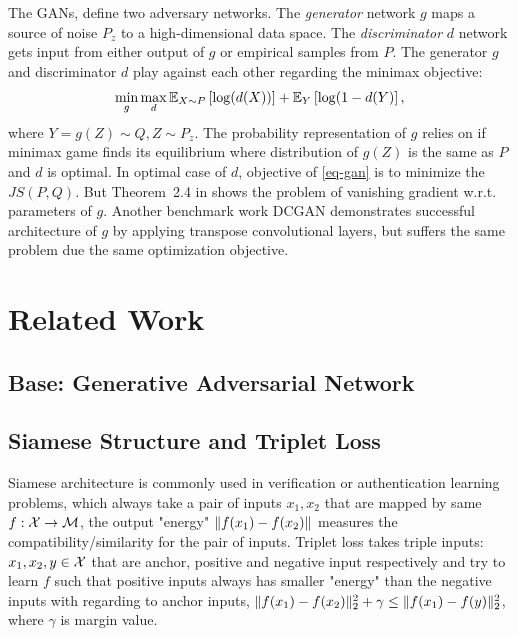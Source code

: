 \begin{remark}
The GANs\cite{NIPS2014_5423},\cite{2017arXiv170100160G} define two
adversary networks. The \emph{generator} network $g$ maps a source of
noise $P_z$ to a high-dimensional data space. The \emph{discriminator} $d$
network gets input from either output of $g$ or empirical samples from
$P$. The generator $g$ and discriminator $d$ play against each other
regarding the minimax objective:
\begin{equation}\label{eq-gan}
  \min_{g} \max_d \mathbb{E}_{X \sim P}\left[ \log(d(X)) \right] + \mathbb{E}_{Y}\left[ \log(1-d(Y) \right],
\end{equation}
where $Y=g(Z)\sim Q, Z \sim P_z$.
The probability representation of $g$ relies on if minimax game finds
its equilibrium where distribution of $g(Z)$ is the same as $P$ and
$d$ is optimal. In optimal case of $d$, objective of
\autoref{eq-gan} is to minimize the $JS(P,Q)$. But
Theorem~2.4 in \cite{2017arXiv170104862A} shows the problem of
vanishing gradient w.r.t. parameters of $g$. Another benchmark work
DCGAN \cite{2015arXiv151106434R} demonstrates successful architecture
of $g$ by applying transpose convolutional layers, but suffers the
same problem due the same optimization objective.

\end{remark}

\section{Related Work}
\subsection{Base: Generative Adversarial Network}


\subsection{Siamese Structure and Triplet Loss}

Siamese architecture is commonly used in verification or
authentication learning problems\cite{1467314}, which always take a
pair of inputs $x_1, x_2$ that are mapped by same $f: \mathcal{X} \rightarrow
\mathcal{M}$, the output "energy" $\| f(x_1) - f(x_2) \|$ measures the
compatibility/similarity for the pair of inputs.
Triplet loss \cite{7298682} takes triple inputs: $x_1, x_2, y \in \mathcal{X}$
that are anchor, positive and negative input respectively and try to
learn $f$ such that positive inputs always has smaller "energy" than
the negative inputs with regarding to anchor inputs,
$\| f(x_1)-f(x_2) \|_{2}^2 + \gamma \le \| f(x_1)-f(y) \|_{2}^2$, 
where $\gamma$ is margin value.

